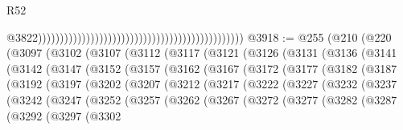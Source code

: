 \begin{lexlean}{R52}
\begin{coremodule}
                                                                                                  @3822)))))))))))))))))))))))))))))))))))))))))))))))
@3918 := @255
    (@210
      (@220
        (@3097
          (@3102
            (@3107
              (@3112
                (@3117
                  (@3121
                    (@3126
                      (@3131
                        (@3136
                          (@3141
                            (@3142
                              (@3147
                                (@3152
                                  (@3157
                                    (@3162
                                      (@3167
                                        (@3172
                                          (@3177
                                            (@3182
                                              (@3187
                                                (@3192
                                                  (@3197
                                                    (@3202
                                                      (@3207
                                                        (@3212
                                                          (@3217
                                                            (@3222
                                                              (@3227
                                                                (@3232
                                                                  (@3237
                                                                    (@3242
                                                                      (@3247
                                                                        (@3252
                                                                          (@3257
                                                                            (@3262
                                                                              (@3267
                                                                                (@3272
                                                                                  (@3277
                                                                                    (@3282
                                                                                      (@3287
                                                                                        (@3292
                                                                                          (@3297
                                                                                            (@3302

\end{coremodule}
\end{lexlean}
